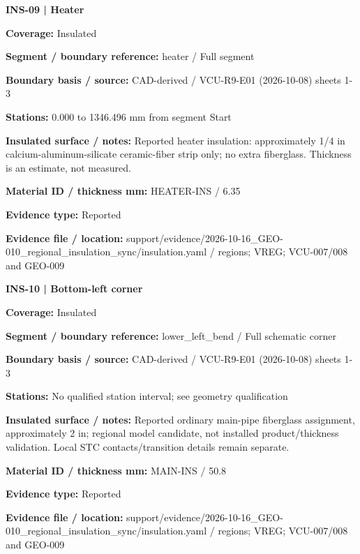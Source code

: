 \documentclass[11pt]{article}
\begin{document}
\par\noindent\begin{minipage}{\textwidth}\small\setlength{\parskip}{2pt}
{\bfseries INS-09 | Heater}\par
\textbf{Coverage:} Insulated\par
\textbf{Segment / boundary reference:} heater / Full segment\par
\textbf{Boundary basis / source:} CAD-derived / VCU-R9-E01 (2026-10-08) sheets 1-3\par
\textbf{Stations:} 0.000 to 1346.496 mm from segment Start\par
\textbf{Insulated surface / notes:} Reported heater insulation: approximately 1/4 in calcium-aluminum-silicate ceramic-fiber strip only; no extra fiberglass. Thickness is an estimate, not measured.\par
\textbf{Material ID / thickness mm:} HEATER-INS / 6.35\par
\textbf{Evidence type:} Reported\par
\textbf{Evidence file / location:} support/evidence/2026-10-16\_\allowbreak{}GEO-010\_\allowbreak{}regional\_\allowbreak{}insulation\_\allowbreak{}sync/insulation.yaml / regions; VREG; VCU-007/008 and GEO-009\par
\end{minipage}\par\vspace{5pt}
\par\noindent\begin{minipage}{\textwidth}\small\setlength{\parskip}{2pt}
{\bfseries INS-10 | Bottom-left corner}\par
\textbf{Coverage:} Insulated\par
\textbf{Segment / boundary reference:} lower\_\allowbreak{}left\_\allowbreak{}bend / Full schematic corner\par
\textbf{Boundary basis / source:} CAD-derived / VCU-R9-E01 (2026-10-08) sheets 1-3\par
\textbf{Stations:} No qualified station interval; see geometry qualification\par
\textbf{Insulated surface / notes:} Reported ordinary main-pipe fiberglass assignment, approximately 2 in; regional model candidate, not installed product/thickness validation. Local STC contacts/transition details remain separate.\par
\textbf{Material ID / thickness mm:} MAIN-INS / 50.8\par
\textbf{Evidence type:} Reported\par
\textbf{Evidence file / location:} support/evidence/2026-10-16\_\allowbreak{}GEO-010\_\allowbreak{}regional\_\allowbreak{}insulation\_\allowbreak{}sync/insulation.yaml / regions; VREG; VCU-007/008 and GEO-009\par
\end{minipage}\par\vspace{5pt}
\end{document}
